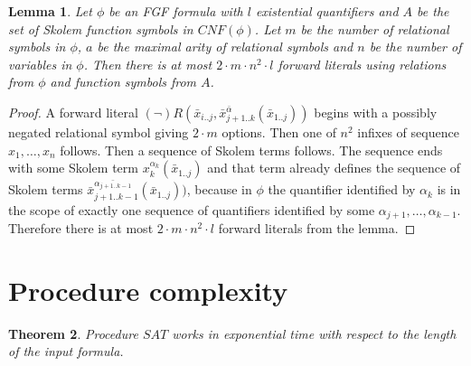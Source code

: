 \documentclass[english, shortabstract]{iithesis}
\theoremstyle{definition} \newtheorem{definition}{Definition}[chapter]
\theoremstyle{remark} \newtheorem{remark}[definition]{Observation}
\theoremstyle{plain} \newtheorem{theorem}[definition]{Theorem}
\theoremstyle{plain} \newtheorem{lemma}[definition]{Lemma}
\begin{document}
\begin{lemma}
Let $\phi$ be an FGF formula with $l$ existential quantifiers and 
$A$ be the set of Skolem function symbols in $CNF(\phi)$.
Let $m$ be the number of relational symbols in $\phi$, $a$ be the maximal arity
of relational symbols and $n$ be the number of variables in $\phi$. 
Then there is at most $2\cdot m \cdot n^2 \cdot l$ forward literals using relations from $\phi$ and function symbols from $A$.
\end{lemma}
\begin{proof}
A forward literal $(\lnot)R(\bar{x}_{i..j}, \bar{x}^{\bar{\alpha}}_{{j+1..k}}(\bar{x}_{1..j}))$
begins with a possibly negated relational symbol giving $2\cdot m$ options. 
Then one of $n^2$ infixes of sequence $x_1, \dots, x_n$ follows.
Then a sequence of Skolem terms follows.
The sequence ends with some Skolem term $x^{\alpha_k}_k(\bar{x}_{1..j})$ and that term 
already defines the sequence of Skolem terms $\bar{x}^{\bar{\alpha_{j+1..k-1}}}_{{j+1..k-1}}(\bar{x}_{1..j}))$,
because in $\phi$ the quantifier identified by $\alpha_k$ is in the scope of exactly one sequence of quantifiers identified by some $\alpha_{j+1},\dots, \alpha_{k-1}$.
Therefore there is at most $2\cdot m \cdot n^2 \cdot l$ forward literals from the lemma.
\end{proof}

\section{Procedure complexity}

\begin{theorem}
Procedure $SAT$ works in exponential time with respect to the length of the input formula. 
\end{theorem}
\end{document}
